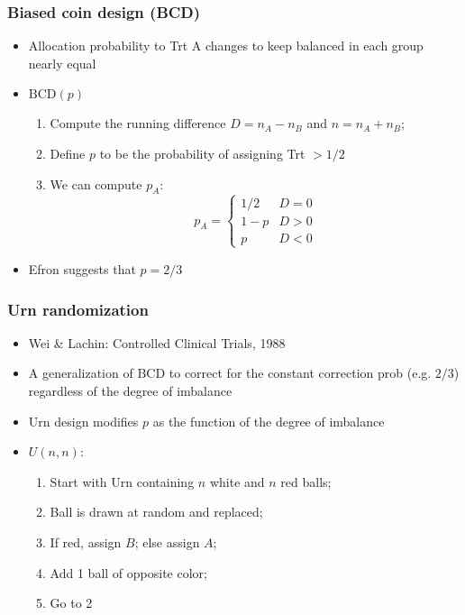 \documentclass[table,10pt]{beamer}
\begin{document}
\begin{CJK*}{UTF8}{gbsn}
\begin{frame}[t]
\frametitle{Biased coin design (BCD)}
\begin{itemize}[<+->]
	\item Allocation probability to Trt A changes to keep balanced in 
		each group nearly equal
	\item $\textrm{BCD}(p)$
	\begin{enumerate}[(1)]
		\item Compute the \alert{running difference} $D = n_A - n_B$ and 
			$n = n_A + n_B$;
		\item Define $p$ to be the probability of assigning Trt $> 1/2$
		\item We can compute $p_A$:
		$$
p_A = \begin{cases}
1/2 & D = 0\\
1-p & D > 0\\
p & D < 0
\end{cases}
		$$
	\end{enumerate}
	\item Efron suggests that $p=2/3$
\end{itemize}
\end{frame}

\begin{frame}[t]
\frametitle{Urn randomization}
\begin{itemize}
	\item Wei \& Lachin: Controlled Clinical Trials, 1988
	\item A generalization of BCD to correct for the constant correction prob 
		(e.g. $2/3$) regardless of the degree of imbalance
	\item Urn design modifies $p$ as the function of the degree of imbalance
	\item $U(n, n)$:
	\begin{enumerate}
		\item Start with Urn containing $n$ white and $n$ red balls;
		\item Ball is drawn at random and replaced;
		\item If red, assign $B$; else assign $A$;
		\item Add 1 ball of opposite color;
		\item Go to 2
	\end{enumerate}
\end{itemize}
\end{frame}



\end{CJK*}
\end{document}
